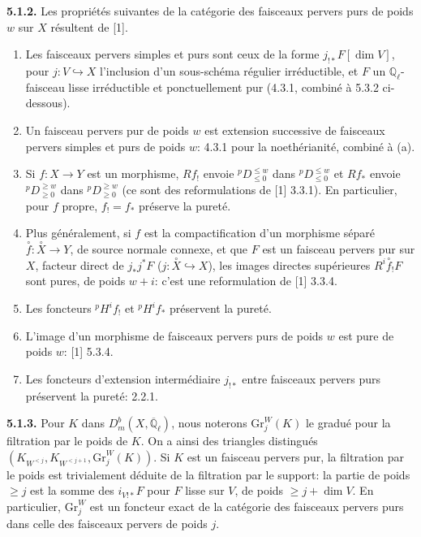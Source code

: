 \documentclass[12pt,a4paper]{article}
\theoremstyle{plain}
\theoremstyle{definition}
\newcommand{\into}{\hookrightarrow}
\begin{document}
\noindent\textbf{5.1.2.} Les propri\'{e}t\'{e}s suivantes de la cat\'{e}gorie des faisceaux pervers purs de poids $w$ sur $X$ r\'{e}sultent de [1].
\begin{enumerate}
\item[(a)] Les faisceaux pervers simples et purs sont ceux de la forme $j_{!*}F[\dim V]$, pour $j: V \into X$ l'inclusion d'un sous-sch\'{e}ma r\'{e}gulier irr\'{e}ductible, et $F$ un $\mathbb{Q}_{\ell}$-faisceau lisse irr\'{e}ductible et ponctuellement pur (4.3.1, combin\'{e} \`{a} 5.3.2 ci-dessous).
\item[(b)] Un faisceau pervers pur de poids $w$ est extension successive de faisceaux pervers simples et purs de poids $w$: 4.3.1 pour la noeth\'{e}rianit\'{e}, combin\'{e} \`{a} (a).
\item[(c)] Si $f: X \to Y$ est un morphisme, $Rf_{!}$ envoie ${}^{p}D^{\leq w}_{\leq 0}$ dans ${}^{p}D^{\leq w}_{\leq 0}$ et $Rf_{*}$ envoie ${}^{p}D^{\geq w}_{\geq 0}$ dans ${}^{p}D^{\geq w}_{\geq 0}$ (ce sont des reformulations de [1] 3.3.1). En particulier, pour $f$ propre, $f_{!} = f_{*}$ pr\'{e}serve la puret\'{e}.
\item[(d)] Plus g\'{e}n\'{e}ralement, si $f$ est la compactification d'un morphisme s\'{e}par\'{e} $\overset{\circ}{f}: \overset{\circ}{X} \to Y$, de source normale connexe, et que $F$ est un faisceau pervers pur sur $X$, facteur direct de $j_{*}j^{*}F$ ($j: \overset{\circ}{X} \into X$), les images directes sup\'{e}rieures $R^{i}\!\overset{\circ}{f}_{!}F$ sont pures, de poids $w+i$: c'est une reformulation de [1] 3.3.4.
\item[(e)] Les foncteurs ${}^{p}H^{i}f_{!}$ et ${}^{p}H^{i}f_{*}$ pr\'{e}servent la puret\'{e}.
\item[(f)] L'image d'un morphisme de faisceaux pervers purs de poids $w$ est pure de poids $w$: [1] 5.3.4.
\item[(g)] Les foncteurs d'extension interm\'{e}diaire $j_{!*}$ entre faisceaux pervers purs pr\'{e}servent la puret\'{e}: 2.2.1.
\end{enumerate}

\noindent\textbf{5.1.3.} Pour $K$ dans $D_{m}^{b}(X, \overline{\mathbb{Q}}_{\ell})$, nous noterons $\mathrm{Gr}_{j}^{W}(K)$ le gradu\'{e} pour la filtration par le poids de $K$. On a ainsi des triangles distingu\'{e}s $(K_{W^{<j}}, K_{W^{<j+1}}, \mathrm{Gr}_{j}^{W}(K))$. Si $K$ est un faisceau pervers pur, la filtration par le poids est trivialement d\'{e}duite de la filtration par le support: la partie de poids $\geq j$ est la somme des $i_{V!*}F$ pour $F$ lisse sur $V$, de poids $\geq j + \dim V$. En particulier, $\mathrm{Gr}_{j}^{W}$ est un foncteur exact de la cat\'{e}gorie des faisceaux pervers purs dans celle des faisceaux pervers de poids $j$.
\end{document}
